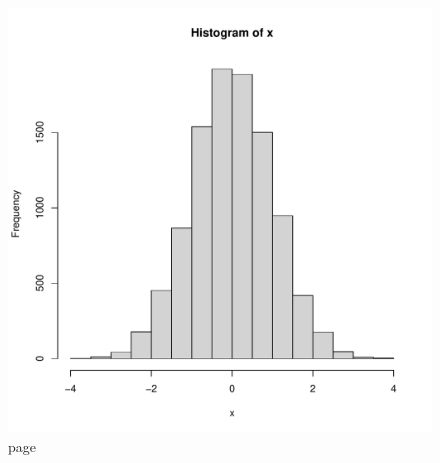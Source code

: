 \documentclass[11pt]{article}
\theoremstyle{quest}
\begin{document}
\begin{figure}[p!]  
\centering 
\includegraphics[scale=0.7]{figs/normal.pdf} 
\caption{ 
  page 
}
\end{figure}
\end{document}
